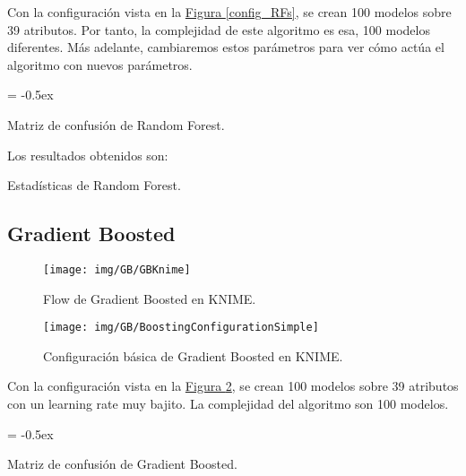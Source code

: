 \documentclass[paper=a4, fontsize=12pt]{article} %
\numberwithin{equation}{section} %
\numberwithin{figure}{section} %
\numberwithin{table}{section} %
\begin{document}
	Con la configuración vista en la \hyperref[config_RFs]{Figura \ref*{config_RFs}}, se crean 100 modelos sobre 39 atributos. Por tanto, la complejidad de este algoritmo es esa, 100 modelos diferentes. Más adelante, cambiaremos estos parámetros para ver cómo actúa el algoritmo con nuevos parámetros.

	\extrarowheight = -0.5ex %
	\renewcommand{\arraystretch}{1.75} %
	\begin{table}[H]
		\begin{center}
		\end{center}
		\caption {Matriz de confusión de Random Forest.}
		\label {mcRFs}
	\end{table}

	Los resultados obtenidos son:
	\begin{table}[H]
		\begin{center}
		\end{center}
		\caption {Estadísticas de Random Forest.}
		\label {statisticsRFs}
	\end{table}

\subsection {Gradient Boosted}

	\begin{figure}[H]
	  \centering
	  \texttt{[image: img/GB/GBKnime]}
	  \caption{Flow de Gradient Boosted en KNIME.}
	  \label{flow_GBs}
	\end{figure}

	\begin{figure}[H]
	  \centering
	  \texttt{[image: img/GB/BoostingConfigurationSimple]}
	  \caption{Configuración básica de Gradient Boosted en KNIME.}
	  \label{config_GBs}
	\end{figure}

	Con la configuración vista en la \hyperref[config_RFs]{Figura \ref*{config_GBs}}, se crean 100 modelos sobre 39 atributos con un learning rate muy bajito. La complejidad del algoritmo son 100 modelos.

	\extrarowheight = -0.5ex %
	\renewcommand{\arraystretch}{1.75} %
	\begin{table}[H]
		\begin{center}
		\end{center}
		\caption {Matriz de confusión de Gradient Boosted.}
		\label {mcGBs}
	\end{table}
\end{document}
